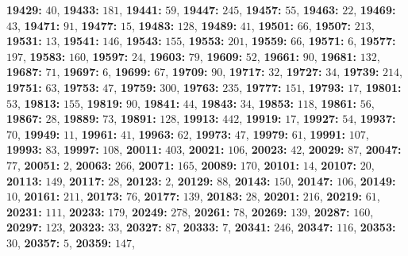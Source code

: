 \textsf{\bfseries 19429:} $40$, \textsf{\bfseries 19433:} $181$, \textsf{\bfseries 19441:} $59$, \textsf{\bfseries 19447:} $245$, \textsf{\bfseries 19457:} $55$, \textsf{\bfseries 19463:} $22$, \textsf{\bfseries 19469:} $43$, \textsf{\bfseries 19471:} $91$, \textsf{\bfseries 19477:} $15$, \textsf{\bfseries 19483:} $128$, \textsf{\bfseries 19489:} $41$, \textsf{\bfseries 19501:} $66$, \textsf{\bfseries 19507:} $213$, \textsf{\bfseries 19531:} $13$, \textsf{\bfseries 19541:} $146$, \textsf{\bfseries 19543:} $155$, \textsf{\bfseries 19553:} $201$, \textsf{\bfseries 19559:} $66$, \textsf{\bfseries 19571:} $6$, \textsf{\bfseries 19577:} $197$, \textsf{\bfseries 19583:} $160$, \textsf{\bfseries 19597:} $24$, \textsf{\bfseries 19603:} $79$, \textsf{\bfseries 19609:} $52$, \textsf{\bfseries 19661:} $90$, \textsf{\bfseries 19681:} $132$, \textsf{\bfseries 19687:} $71$, \textsf{\bfseries 19697:} $6$, \textsf{\bfseries 19699:} $67$, \textsf{\bfseries 19709:} $90$, \textsf{\bfseries 19717:} $32$, \textsf{\bfseries 19727:} $34$, \textsf{\bfseries 19739:} $214$, \textsf{\bfseries 19751:} $63$, \textsf{\bfseries 19753:} $47$, \textsf{\bfseries 19759:} $300$, \textsf{\bfseries 19763:} $235$, \textsf{\bfseries 19777:} $151$, \textsf{\bfseries 19793:} $17$, \textsf{\bfseries 19801:} $53$, \textsf{\bfseries 19813:} $155$, \textsf{\bfseries 19819:} $90$, \textsf{\bfseries 19841:} $44$, \textsf{\bfseries 19843:} $34$, \textsf{\bfseries 19853:} $118$, \textsf{\bfseries 19861:} $56$, \textsf{\bfseries 19867:} $28$, \textsf{\bfseries 19889:} $73$, \textsf{\bfseries 19891:} $128$, \textsf{\bfseries 19913:} $442$, \textsf{\bfseries 19919:} $17$, \textsf{\bfseries 19927:} $54$, \textsf{\bfseries 19937:} $70$, \textsf{\bfseries 19949:} $11$, \textsf{\bfseries 19961:} $41$, \textsf{\bfseries 19963:} $62$, \textsf{\bfseries 19973:} $47$, \textsf{\bfseries 19979:} $61$, \textsf{\bfseries 19991:} $107$, \textsf{\bfseries 19993:} $83$, \textsf{\bfseries 19997:} $108$, \textsf{\bfseries 20011:} $403$, \textsf{\bfseries 20021:} $106$, \textsf{\bfseries 20023:} $42$, \textsf{\bfseries 20029:} $87$, \textsf{\bfseries 20047:} $77$, \textsf{\bfseries 20051:} $2$, \textsf{\bfseries 20063:} $266$, \textsf{\bfseries 20071:} $165$, \textsf{\bfseries 20089:} $170$, \textsf{\bfseries 20101:} $14$, \textsf{\bfseries 20107:} $20$, \textsf{\bfseries 20113:} $149$, \textsf{\bfseries 20117:} $28$, \textsf{\bfseries 20123:} $2$, \textsf{\bfseries 20129:} $88$, \textsf{\bfseries 20143:} $150$, \textsf{\bfseries 20147:} $106$, \textsf{\bfseries 20149:} $10$, \textsf{\bfseries 20161:} $211$, \textsf{\bfseries 20173:} $76$, \textsf{\bfseries 20177:} $139$, \textsf{\bfseries 20183:} $28$, \textsf{\bfseries 20201:} $216$, \textsf{\bfseries 20219:} $61$, \textsf{\bfseries 20231:} $111$, \textsf{\bfseries 20233:} $179$, \textsf{\bfseries 20249:} $278$, \textsf{\bfseries 20261:} $78$, \textsf{\bfseries 20269:} $139$, \textsf{\bfseries 20287:} $160$, \textsf{\bfseries 20297:} $123$, \textsf{\bfseries 20323:} $33$, \textsf{\bfseries 20327:} $87$, \textsf{\bfseries 20333:} $7$, \textsf{\bfseries 20341:} $246$, \textsf{\bfseries 20347:} $116$, \textsf{\bfseries 20353:} $30$, \textsf{\bfseries 20357:} $5$, \textsf{\bfseries 20359:} $147$, 

